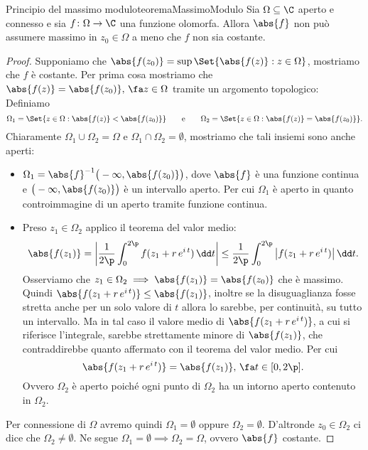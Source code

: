 \begin{teor}{Principio del massimo modulo}{teoremaMassimoModulo}
	Sia \(\Omega\subseteq \C\) aperto e connesso e sia \(f\colon \Omega \to \C\) una funzione olomorfa.
	Allora \(\abs{f}\) non può assumere massimo in \(z_0\in\Omega\) a meno che \(f\) non sia costante.
\end{teor}

\begin{proof}
	Supponiamo che \(\abs{f(z_0)}=\sup\Set{\abs{f(z)}:z\in\Omega}\), mostriamo che \(f\) è costante.
	Per prima cosa mostriamo che \(\abs{f(z)}=\abs{f(z_0)},\,\fa z\in\Omega\) tramite un argomento topologico:
	Definiamo
	\[
		\Omega_1 = \Set{z\in\Omega : \abs{f(z)} < \abs{f(z_0)}} \qquad\text{e}\qquad \Omega_2 = \Set{z\in\Omega : \abs{f(z)}=\abs{f(z_0)}}.
	\]
	Chiaramente \(\Omega_1\cup\Omega_2 = \Omega\) e \(\Omega_1\cap\Omega_2 = \emptyset\), mostriamo che tali insiemi sono anche aperti:
	\begin{itemize}
		\item \(\Omega_1 = \abs{f}^{-1}\big(-\infty,\abs{f(z_0)}\big)\), dove \(\abs{f}\) è una funzione continua e \(\big(-\infty,\abs{f(z_0)}\big)\) è un intervallo aperto. Per cui \(\Omega_1\) è aperto in quanto controimmagine di un aperto tramite funzione continua.
		\item Preso \(z_1\in\Omega_2\) applico il teorema del valor medio:
		      \[
			      \abs{f(z_1)} = \bigg\lvert \frac{1}{2\p} \int_0^{2\p}f(z_1+r\,e^{i\,t})\,\dd t\bigg\rvert \le \frac{1}{2\p} \int_0^{2\p}\big\lvert f(z_1+r\,e^{i\,t})\big\rvert\,\dd t.
		      \]
		      Osserviamo che \(z_1\in\Omega_2 \implies \abs{f(z_1)}=\abs{f(z_0)}\) che è massimo. Quindi \(\abs{f(z_1+r\,e^{i\,t})}\le \abs{f(z_1)}\), inoltre se la disuguaglianza fosse stretta anche per un solo valore di \(t\) allora lo sarebbe, per continuità, su tutto un intervallo. Ma in tal caso il valore medio di \(\abs{f(z_1+r\,e^{i\,t})}\), a cui si riferisce l'integrale, sarebbe strettamente minore di \(\abs{f(z_1)}\), che contraddirebbe quanto affermato con il teorema del valor medio. Per cui
		      \[
			      \abs{f(z_1+r\,e^{i\,t})} = \abs{f(z_1)},\,\fa t \in [0,2\p].
		      \]
		      Ovvero \(\Omega_2\) è aperto poiché ogni punto di \(\Omega_2\) ha un intorno aperto contenuto in \(\Omega_2\).
	\end{itemize}
	Per connessione di \(\Omega\) avremo quindi \(\Omega_1=\emptyset\) oppure \(\Omega_2=\emptyset\). D'altronde \(z_0\in\Omega_2\) ci dice che \(\Omega_2 \neq \emptyset\). Ne segue \(\Omega_1=\emptyset \implies \Omega_2=\Omega\), ovvero \(\abs{f}\) costante.


\end{proof}
